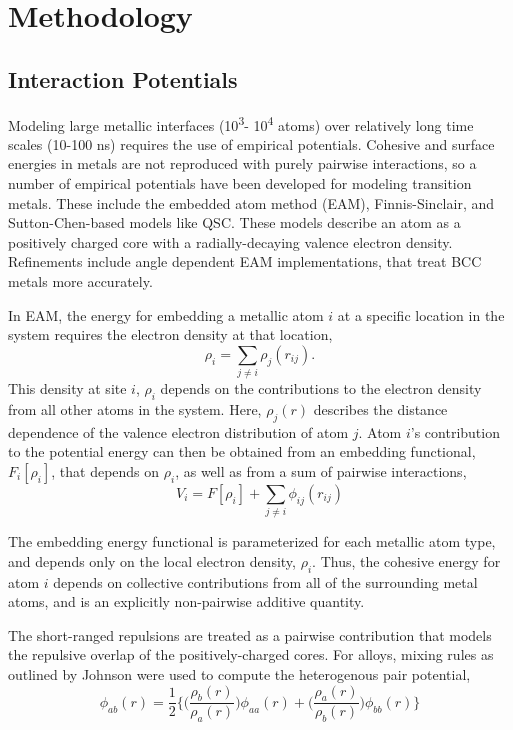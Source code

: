 \section{Methodology}
\subsection{Interaction Potentials}

Modeling large metallic interfaces (10\textsuperscript{3}-
10\textsuperscript{4} atoms) over relatively long time scales (10-100
ns) requires the use of empirical potentials. Cohesive and surface
energies in metals are not reproduced with purely pairwise
interactions, so a number of empirical potentials have been developed
for modeling transition metals.  These include the embedded atom
method (EAM)\citep{EAM}, Finnis-Sinclair,\citep{Finnis84} and
Sutton-Chen-based models like QSC.\citep{QSC} These models describe an
atom as a positively charged core with a radially-decaying valence
electron density.  Refinements include angle dependent EAM
implementations,\citep{Baskes:1987} that treat BCC metals more
accurately.

In EAM, the energy for embedding a metallic atom $i$ at a specific
location in the system requires the electron density at that location,
\begin{equation*}
\rho_i = \sum_{j\neq i} \rho_j(r_{ij}).
\end{equation*}
This density at site $i$, $\rho_i$ depends on the contributions to the
electron density from all other atoms in the system.  Here,
$\rho_j(r)$ describes the distance dependence of the valence electron
distribution of atom $j$.  Atom $i$'s contribution to the potential
energy can then be obtained from an embedding functional, $F_i\left[
  \rho_i \right]$, that depends on $\rho_i$, as well as from a sum of
pairwise interactions,
\begin{equation*}
  V_i =  F[ \rho_i ]  + \sum_{j \neq i} \phi_{ij}(r_{ij})
\end{equation*}

The embedding energy functional is parameterized for each metallic
atom type, and depends only on the local electron density, $\rho_i$.
Thus, the cohesive energy for atom $i$ depends on collective
contributions from all of the surrounding metal atoms, and is an
explicitly non-pairwise additive quantity.

The short-ranged repulsions are treated as a pairwise contribution
that models the repulsive overlap of the positively-charged cores.
For alloys, mixing rules as outlined by Johnson \citep{Johnson89} were
used to compute the heterogenous pair potential,
\begin{equation*} 
\phi_{ab}(r) = \frac{1}{2}
\bigg\{ \bigg(
\frac{\rho_b(r)}{\rho_a(r)}
\bigg) \phi_{aa}(r)
+ \bigg(
\frac{\rho_a(r)}{\rho_b(r)}
\bigg)\phi_{bb}(r) 
\bigg\}
\end{equation*} 


